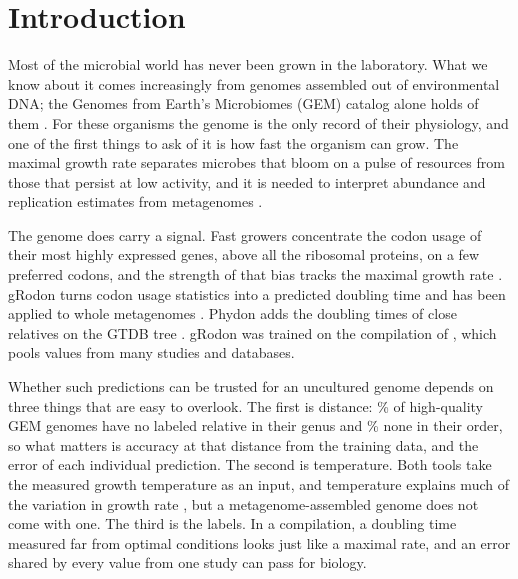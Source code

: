 \section{Introduction}
Most of the microbial world has never been grown in the laboratory. What we know about it comes increasingly from genomes
assembled out of environmental DNA; the Genomes from Earth's Microbiomes (GEM) catalog alone holds \NGEMTotal of them
\citep{nayfach2021}. For these organisms the genome is the only record of their physiology, and one of the first things to ask
of it is how fast the organism can grow. The maximal growth rate separates microbes that bloom on a pulse of resources from
those that persist at low activity, and it is needed to interpret abundance and replication estimates from metagenomes
\citep{vieirasilva2010,roller2016,kirchman2016}.

The genome does carry a signal. Fast growers concentrate the codon usage of their most highly expressed genes, above all the
ribosomal proteins, on a few preferred codons, and the strength of that bias tracks the maximal growth rate
\citep{vieirasilva2010}. gRodon turns codon usage statistics into a predicted doubling time \citep{weissman2021} and has been
applied to whole metagenomes \citep{weissman2022}. Phydon adds the doubling times of close relatives on the GTDB tree
\citep{xu2025,parks2022}. gRodon was trained on the compilation of \citet{madin2020}, which pools values from many studies and
databases.

Whether such predictions can be trusted for an uncultured genome depends on three things that are easy to overlook. The first
is distance: \GEMShareNoGenus\% of high-quality GEM genomes have no labeled relative in their genus and \GEMShareNewOrder\% none
in their order, so what matters is accuracy at that distance from the training data, and the error of each individual
prediction. The second is temperature. Both tools take the measured growth temperature as an input, and temperature explains
much of the variation in growth rate \citep{corkrey2016}, but a metagenome-assembled genome does not come with one. The third is the labels. In a
compilation, a doubling time measured far from optimal conditions looks just like a maximal rate, and an error shared by every
value from one study can pass for biology.

